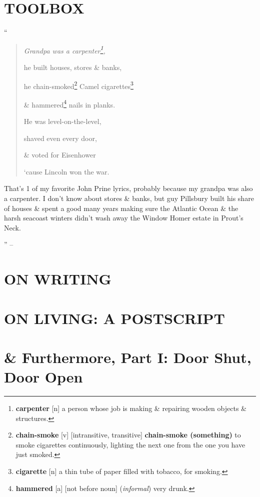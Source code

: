 \documentclass[oneside]{book}
\numberwithin{equation}{section}
\begin{document}
\section{TOOLBOX}

``\begin{quotation}\it
	Grandpa was a carpenter\footnote{\textbf{carpenter} [n] a person whose job is making \& repairing wooden objects \& structures.},
	
	he built houses, stores \& banks,
	
	he chain-smoked\footnote{\textbf{chain-smoke} [v] [intransitive, transitive] \textbf{chain-smoke (something)} to smoke cigarettes continuously, lighting the next one from the one you have just smoked.} Camel cigarettes\footnote{\textbf{cigarette} [n] a thin tube of paper filled with tobacco, for smoking.}
	
	\& hammered\footnote{\textbf{hammered} [a] [not before noun] (\textit{informal}) very drunk.} nails in planks.
	
	He was level-on-the-level,
	
	shaved even every door,
	
	\& voted for Eisenhower
	
	`cause Lincoln won the war.
\end{quotation}
That's 1 of my favorite John Prine lyrics, probably because my grandpa was also a carpenter. I don't know about stores \& banks, but guy Pillsbury built his share of houses \& spent a good many years making sure the Atlantic Ocean \& the harsh seacoast winters didn't wash away the Window Homer estate in Prout's Neck.

'' -- \cite[pp. 85--]{King2010}


\section{ON WRITING}


\section{ON LIVING: A POSTSCRIPT}


\section{\& Furthermore, Part I: Door Shut, Door Open}
\end{document}
